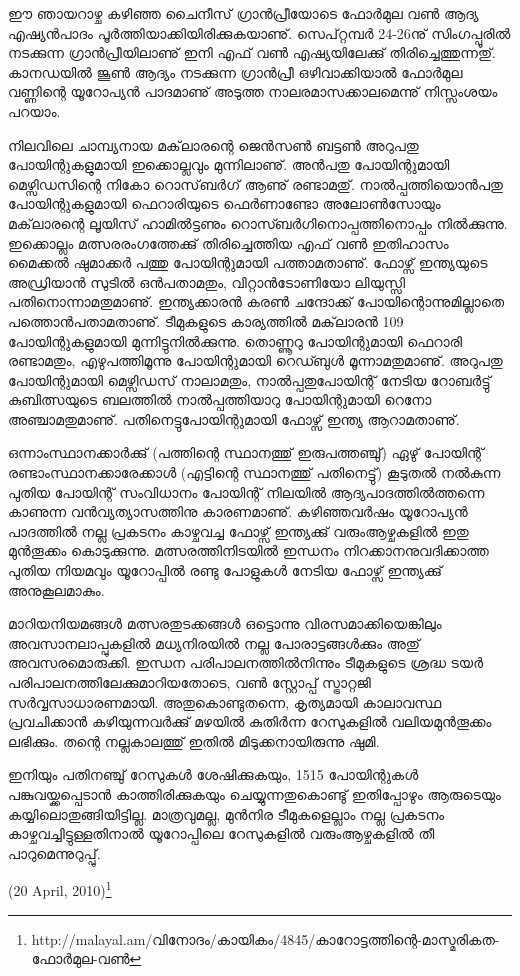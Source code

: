 ﻿
\vskip 2pt
ഈ ഞായറാഴ്ച കഴിഞ്ഞ ചൈനീസ് ഗ്രാന്‍പ്രീയോടെ ഫോര്‍മുല വണ്‍ ആദ്യ എഷ്യന്‍പാദം പൂര്‍ത്തിയാക്കിയിരിക്കുകയാണു്. 
സെപ്റ്റമ്പര്‍ 24-26നു് സിംഗപ്പൂരില്‍ നടക്കുന്ന ഗ്രാന്‍പ്രീയിലാണു് ഇനി എഫ് വണ്‍ എഷ്യയിലേക്കു് തിരിച്ചെത്തുന്നതു്.
കാനഡയില്‍ ജൂണ്‍ ആദ്യം നടക്കുന്ന ഗ്രാന്‍പ്രീ ഒഴിവാക്കിയാല്‍ ഫോര്‍മുല വണ്ണിന്റെ യൂറോപ്യന്‍ പാദമാണു് അടുത്ത 
നാലരമാസക്കാലമെന്നു് നിസ്സംശയം പറയാം.

നിലവിലെ ചാമ്പ്യനായ മക്‌ലാരന്റെ ജെന്‍സണ്‍ ബട്ടണ്‍ അറുപതു പോയിന്റുകളുമായി ഇക്കൊല്ലവും മുന്നിലാണു്. 
അന്‍പതു പോയിന്റുമായി മെഴ്സിഡസിന്റെ നികോ റൊസ്‌ബര്‍ഗ് ആണു് രണ്ടാമതു്. നാല്‍പ്പത്തിയൊന്‍പതു പോയിന്റുകളുമായി 
ഫെറാരിയുടെ ഫെര്‍ണാണ്ടോ അലോണ്‍സോയും മക്‌ലാരന്റെ ലൂയിസ് ഹാമില്‍ട്ടണും റൊസ്ബര്‍ഗിനൊപ്പത്തിനൊപ്പം 
നില്‍ക്കുന്നു. ഇക്കൊല്ലം മത്സരരംഗത്തേക്കു് തിരിച്ചെത്തിയ എഫ് വണ്‍ ഇതിഹാസം മൈക്കല്‍ ഷുമാക്കര്‍ പത്തു 
പോയിന്റുമായി പത്താമതാണു്. ഫോഴ്സ് ഇന്ത്യയുടെ അഡ്രിയാന്‍ സുടില്‍ ഒന്‍പതാമതും, വിറ്റാന്‍ടോണിയോ ലിയുസ്സി 
പതിനൊന്നാമതുമാണു്. ഇന്ത്യക്കാരന്‍ കരണ്‍ ചന്ദോക്ക് പോയിന്റൊന്നുമില്ലാതെ പത്തൊന്‍പതാമതാണു്. ടീമുകളുടെ 
കാര്യത്തില്‍ മക്‌ലാരന്‍ 109 പോയിന്റുകളുമായി മുന്നിട്ടുനില്‍ക്കുന്നു. തൊണ്ണൂറു പോയിന്റുമായി ഫെറാരി രണ്ടാമതും, 
എഴുപത്തിമൂന്നു പോയിന്റുമായി റെഡ്ബുള്‍ മൂന്നാമതുമാണു്. അറുപതു പോയിന്റുമായി മെഴ്സിഡസ് നാലാമതും, 
നാല്‍പ്പതുപോയിന്റ് നേടിയ റോബര്‍ട്ടു് കുബിത്സയുടെ ബലത്തില്‍ നാല്‍പ്പത്തിയാറു പോയിന്റുമായി റെനോ 
അഞ്ചാമതുമാണു്. പതിനെട്ടുപോയിന്റുമായി ഫോഴ്സ് ഇന്ത്യ ആറാമതാണു്.

ഒന്നാംസ്ഥാനക്കാര്‍ക്കു് (പത്തിന്റെ സ്ഥാനത്തു് ഇരുപത്തഞ്ചു്) ഏഴു് പോയിന്റ് രണ്ടാംസ്ഥാനക്കാരേക്കാള്‍ (എട്ടിന്റെ 
സ്ഥാനത്തു് പതിനെട്ടു്) കൂടുതല്‍ നല്‍കുന്ന പുതിയ പോയിന്റ് സംവിധാനം പോയിന്റ് നിലയില്‍ ആദ്യപാദത്തില്‍ത്തന്നെ 
കാണുന്ന വന്‍വ്യത്യാസത്തിനു കാരണമാണു്. കഴിഞ്ഞവര്‍ഷം യൂറോപ്യന്‍ പാദത്തില്‍ നല്ല പ്രകടനം കാഴ്ചവച്ച 
ഫോഴ്സ് ഇന്ത്യക്കു് വരുംആഴ്ചകളില്‍ ഇതു മുന്‍തൂക്കം കൊടുക്കുന്നു. മത്സരത്തിനിടയില്‍ ഇന്ധനം നിറക്കാനനുവദിക്കാത്ത 
പുതിയ നിയമവും യൂറോപ്പില്‍ രണ്ടു പോളുകള്‍ നേടിയ ഫോഴ്സ് ഇന്ത്യക്കു് അനുകൂലമാകും.

മാറിയനിയമങ്ങള്‍ മത്സരതുടക്കങ്ങള്‍ ഒട്ടൊന്നു വിരസമാക്കിയെങ്കിലും അവസാനലാപ്പുകളില്‍ മധ്യനിരയില്‍ നല്ല 
പോരാട്ടങ്ങള്‍ക്കും അതു് അവസരമൊരുക്കി. ഇന്ധന പരിപാലനത്തില്‍നിന്നും ടീമുകളുടെ ശ്രദ്ധ ടയര്‍ 
പരിപാലനത്തിലേക്കുമാറിയതോടെ, വണ്‍ സ്റ്റോപ്പ് സ്ട്രാറ്റജി സര്‍‌വ്വസാധാരണമായി. അതുകൊണ്ടുതന്നെ, കൃത്യമായി 
കാലാവസ്ഥ പ്രവചിക്കാന്‍ കഴിയുന്നവര്‍ക്കു് മഴയില്‍ കുതിര്‍ന്ന റേസുകളില്‍ വലിയമുന്‍തൂക്കം ലഭിക്കും. തന്റെ നല്ലകാലത്തു് 
ഇതില്‍ മിടുക്കനായിരുന്നു ഷുമി.

ഇനിയും പതിനഞ്ചു് റേസുകള്‍ ശേഷിക്കുകയും, 1515 പോയിന്റുകള്‍ പങ്കുവയ്ക്കപ്പെടാന്‍ കാത്തിരിക്കുകയും ചെയ്യുന്നതുകൊണ്ടു് 
ഇതിപ്പോഴും ആരുടെയും കയ്യിലൊതുങ്ങിയിട്ടില്ല. മാത്രവുമല്ല, മുന്‍നിര ടീമുകളെല്ലാം നല്ല പ്രകടനം കാഴ്ചവച്ചിട്ടുള്ളതിനാല്‍ 
യൂറോപ്പിലെ റേസുകളില്‍ വരുംആഴ്ചകളില്‍ തീ പാറുമെന്നുറുപ്പു്. 

\begin{flushright}(20 April, 2010)\footnote{http://malayal.am/വിനോദം/കായികം/4845/കാറോട്ടത്തിന്റെ-മാസ്മരികത-ഫോര്‍മുല-വണ്‍}\end{flushright}

\newpage
